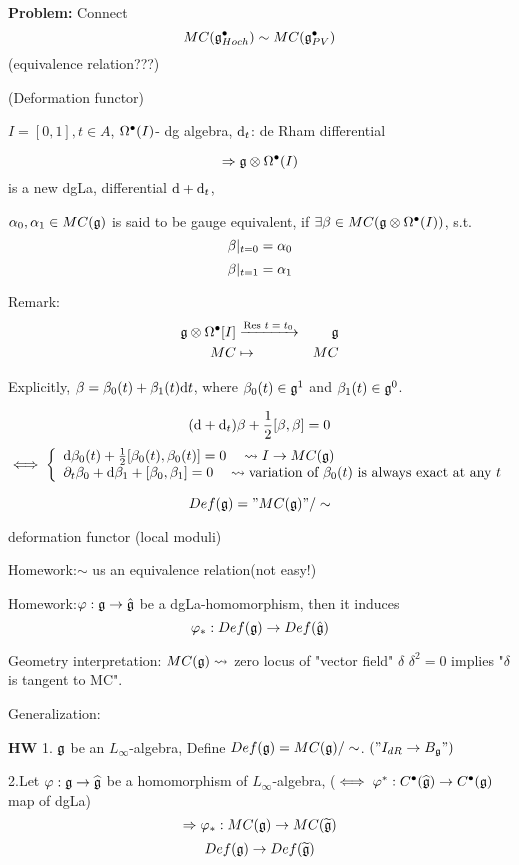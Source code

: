 \textbf{Problem:} Connect
$$MC(\mathfrak{g}_{Hoch}^{\bullet})\sim MC(\mathfrak{g}_{PV}^{\bullet})$$
(equivalence relation???)


(Deformation functor)

$I=[0,1],t\in A$, $\Omega^{\bullet}(I)$- dg algebra, $\mathrm{d}_t$: de Rham differential

$$\Rightarrow \mathfrak{g}\otimes\Omega^{\bullet}(I)$$
is a new dgLa, differential $\mathrm{d}+\mathrm{d}_t$,

\begin{definition}
$\alpha_0,\alpha_1\in MC(\mathfrak{g})$ is said to be gauge equivalent,
if $\exists\beta\in MC(\mathfrak{g}\otimes\Omega^{\bullet}(I))$, s.t.
$$\beta|_{t=0}=\alpha_0$$
$$\beta|_{t=1}=\alpha_1$$
\end{definition}

Remark:
\begin{eqnarray*}
\mathfrak{g}\otimes\Omega^{\bullet}[I]&\xrightarrow{\text{Res $t=t_0$}}&\mathfrak{g}\\
MC&\mapsto& MC
\end{eqnarray*}

Explicitly, $\beta=\beta_0(t)+\beta_1(t)\mathrm{d} t$,
where $\beta_0(t)\in\mathfrak{g}^1$ and $\beta_1(t)\in\mathfrak{g}^0$.

$$(\mathrm{d}+\mathrm{d}_t)\beta+\frac{1}{2}[\beta,\beta]=0$$
$$\iff
  \left\{
    \begin{array}{l}
      \mathrm{d}\beta_0(t)+\frac{1}{2}[\beta_0(t),\beta_0(t)]=0
      \quad\rightsquigarrow I\to MC(\mathfrak{g})
    \\
      \partial_t\beta_0+\mathrm{d}\beta_1+[\beta_0,\beta_1]=0
      \quad\rightsquigarrow\text{variation of $\beta_0(t)$ is always exact at any $t$}
    \end{array}
  \right.
$$

\begin{definition}
$$Def(\mathfrak{g})="MC(\mathfrak{g})"/\sim$$
\end{definition}
deformation functor (local moduli)

Homework:$\sim$ us an equivalence relation(not easy!)

Homework:$\varphi:\mathfrak{g}\to\hat{\mathfrak{g}}$ be a dgLa-homomorphism,
then it induces
$$\varphi_*:Def(\mathfrak{g})\to Def(\hat{\mathfrak{g}})$$

Geometry interpretation:
$MC(\mathfrak{g})\rightsquigarrow$ zero locus of "vector field" $\delta$
$\delta^2=0$ implies "$\delta$ is tangent to MC".

Generalization:

\textbf{HW} 1. $\mathfrak{g}$ be an $L_\infty$-algebra,
Define $Def(\mathfrak{g})=MC(\mathfrak{g})/\sim$.
$("I_{dR}\to B_{\mathfrak{g}}")$

2.Let $\varphi:\mathfrak{g}\to\widehat{\mathfrak{g}}$ be a homomorphism of $L_\infty$-algebra,
($\iff \varphi^*: C^{\bullet}(\widehat{\mathfrak{g}})\to C^{\bullet}(\mathfrak{g})$ map of dgLa)
$$\Rightarrow\varphi_*:MC(\mathfrak{g})\to MC(\widetilde{\mathfrak{g}})$$
$$Def(\mathfrak{g})\to Def(\widetilde{\mathfrak{g}})$$

